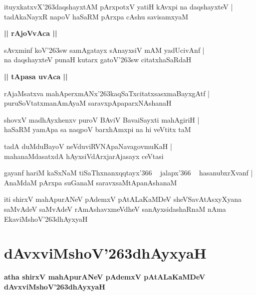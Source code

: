 \documentclass[twoside,12pt,openright]{book}
\def\S{\char'263}
\newcounter{shloka}[chapter]
\def\uvaca#1{\centerline{{\large\textbf{#1}}}}
\begin{document}
\begin{shloka}%
ituyxkatxvX\S daqshayxtAM pArxpotxV yatiH kAvxpi na daqshayxteV |\\
tadAkaNayxR napoV haSaRM pArxpa cAshu savisamxyaM 
\end{shloka}

\uvaca{|| rAjoVvAca ||}

\begin{shloka}%
sAvxminf koV\S sw samAgatayx sAnayxsiV mAM yadUcivAnf |\\
na daqshayxteV punaH kutarx gatoV\S sw citatxhaSaRdaH 
\end{shloka}

\uvaca{|| tApasa uvAca ||}

\begin{shloka}%
rAjaMsatxva mahAperxmANx\S kaqSaTxcitatxsasxmaBayxgAtf |\\
puruSoVtatxmanAmAyaM saravxpApaparxNAshanaH
\end{shloka}

\begin{shloka}%
shovxV madhAyxhenxv puroV BAviV BavaiSayxti mahAgiriH |\\
haSaRM yamApa sa naqpoV barxhAmxpi na hi veVtitx taM
\end{shloka}

\begin{shloka}%
tadA duMduBayoV neVduviRVNApaNavagovmuKaH |\\
mahanaMdasatxdA hAyxsiVdArxjarAjasayx ceVtasi
\end{shloka}

\begin{shloka}%
gayanf hariM kaSxNaM tiSaThxnanxqqtayx\char'366 ~ jalapx\char'366 ~ hasanubxrXvanf |\\
AnaMdaM pArxpa suGanaM saravxsaMtApanAshanaM 
\end{shloka}

\begin{center}
iti shirxV mahApurANeV pAdemxV pAtALaKaMDeV sheVSavAtAsxyXyana saMvAdeV 
saMvAdeV rAmAshavxmeVdheV sanAyxsidashaRnaM nAma EkaviMshoV\S dhAyxyaH
\end{center}

\chapter{dAvxviMshoV\S dhAyxyaH}

\begin{center}
{\LARGE\bfseries atha shirxV mahApurANeV pAdemxV pAtALaKaMDeV dAvxviMshoV\S dhAyxyaH}
\end{center}
\end{document}
